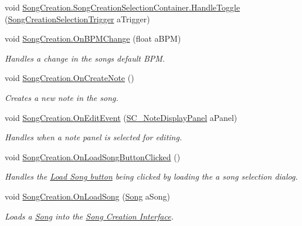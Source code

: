 \begin{DoxyCompactItemize}
\item 
void \hyperlink{group___s_c_handlers_gad63b337e8edf4296db87f6753d187f97}{Song\+Creation.\+Song\+Creation\+Selection\+Container.\+Handle\+Toggle} (\hyperlink{group___s_c_handlers_class_song_creation_1_1_song_creation_selection_container_1_1_song_creation_selection_trigger}{Song\+Creation\+Selection\+Trigger} a\+Trigger)
\item 
void \hyperlink{group___s_c_handlers_ga867d521ac1d7184636c40dad3ebd43b0}{Song\+Creation.\+On\+B\+P\+M\+Change} (float a\+B\+PM)
\begin{DoxyCompactList}\small\item\em Handles a change in the song\textquotesingle{}s default B\+PM. \end{DoxyCompactList}\item 
void \hyperlink{group___s_c_handlers_ga70f2fdac755a6b62f48afd96f2446d71}{Song\+Creation.\+On\+Create\+Note} ()
\begin{DoxyCompactList}\small\item\em Creates a new note in the song. \end{DoxyCompactList}\item 
void \hyperlink{group___s_c_handlers_ga0e93e30073bd61526f8ac1431cc4d2b6}{Song\+Creation.\+On\+Edit\+Event} (\hyperlink{class_s_c___note_display_panel}{S\+C\+\_\+\+Note\+Display\+Panel} a\+Panel)
\begin{DoxyCompactList}\small\item\em Handles when a note panel is selected for editing. \end{DoxyCompactList}\item 
void \hyperlink{group___s_c_handlers_ga77a56bedfce632cf7c341f8fefc02b9a}{Song\+Creation.\+On\+Load\+Song\+Button\+Clicked} ()
\begin{DoxyCompactList}\small\item\em Handles the \hyperlink{group___s_c_priv_var_ga0e016451dff405f570bf530586fb36fa}{Load Song button} being clicked by loading the a song selection dialog. \end{DoxyCompactList}\item 
void \hyperlink{group___s_c_handlers_ga309a4dafb5a81353c6a83bd12ef6a249}{Song\+Creation.\+On\+Load\+Song} (\hyperlink{class_song}{Song} a\+Song)
\begin{DoxyCompactList}\small\item\em Loads a \hyperlink{class_song}{Song} into the \hyperlink{group___doc_s_c}{Song Creation Interface}. \end{DoxyCompactList}\item 

\end{DoxyCompactItemize}
